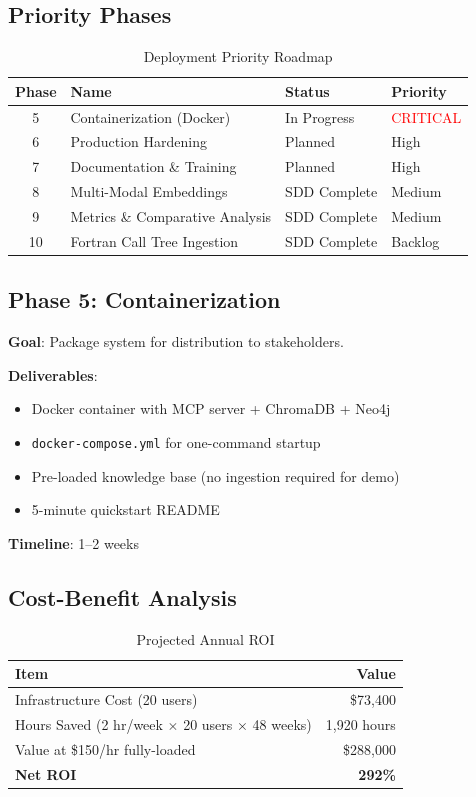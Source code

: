 \documentclass[11pt,letterpaper]{article}
\begin{document}
\subsection{Priority Phases}

\begin{table}[H]
\centering
\caption{Deployment Priority Roadmap}
\begin{tabular}{@{}clll@{}}
\toprule
\textbf{Phase} & \textbf{Name} & \textbf{Status} & \textbf{Priority} \\
\midrule
5 & Containerization (Docker) & In Progress & \textcolor{red}{CRITICAL} \\
6 & Production Hardening & Planned & High \\
7 & Documentation \& Training & Planned & High \\
8 & Multi-Modal Embeddings & SDD Complete & Medium \\
9 & Metrics \& Comparative Analysis & SDD Complete & Medium \\
10 & Fortran Call Tree Ingestion & SDD Complete & Backlog \\
\bottomrule
\end{tabular}
\end{table}

\subsection{Phase 5: Containerization}

\textbf{Goal}: Package system for distribution to stakeholders.

\textbf{Deliverables}:
\begin{itemize}
    \item Docker container with MCP server + ChromaDB + Neo4j
    \item \texttt{docker-compose.yml} for one-command startup
    \item Pre-loaded knowledge base (no ingestion required for demo)
    \item 5-minute quickstart README
\end{itemize}

\textbf{Timeline}: 1--2 weeks

\subsection{Cost-Benefit Analysis}

\begin{table}[H]
\centering
\caption{Projected Annual ROI}
\begin{tabular}{@{}lr@{}}
\toprule
\textbf{Item} & \textbf{Value} \\
\midrule
Infrastructure Cost (20 users) & \$73,400 \\
Hours Saved (2 hr/week $\times$ 20 users $\times$ 48 weeks) & 1,920 hours \\
Value at \$150/hr fully-loaded & \$288,000 \\
\textbf{Net ROI} & \textbf{292\%} \\
\bottomrule
\end{tabular}
\end{table}
\end{document}
